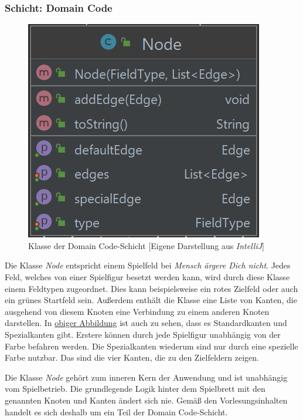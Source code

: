 \subsubsection{Schicht: Domain Code}
\begin{figure}[htbp]
\centering
\centerline{\includegraphics[scale=.35]{node}}
\caption{Klasse der Domain Code-Schicht [Eigene Darstellung aus \emph{IntelliJ}]}
\label{fig:klassedomaincodeschicht}
\end{figure}
\noindent Die Klasse \emph{Node} entspricht einem Spielfeld bei \emph{Mensch ärgere Dich nicht}. Jedes Feld, welches von einer Spielfigur besetzt werden kann, wird durch diese Klasse einem Feldtypen zugeordnet. Dies kann beispielsweise ein rotes Zielfeld oder auch ein grünes Startfeld sein. Außerdem enthält die Klasse eine Liste von Kanten, die ausgehend von diesem Knoten eine Verbindung zu einem anderen Knoten darstellen. In \hyperref[fig:klasseadomaincodeschicht]{obiger Abbildung} ist auch zu sehen, dass es Standardkanten und Spezialkanten gibt. Erstere können durch jede Spielfigur unabhängig von der Farbe befahren werden. Die Spezialkanten wiederum sind nur durch eine spezielle Farbe nutzbar. Das sind die vier Kanten, die zu den Zielfeldern zeigen.

Die Klasse \emph{Node} gehört zum inneren Kern der Anwendung und ist unabhängig vom Spielbetrieb. Die grundlegende Logik hinter dem Spielbrett mit den genannten Knoten und Kanten ändert sich nie. Gemäß den Vorlesungsinhalten handelt es sich deshalb um ein Teil der Domain Code-Schicht.
\newpage
